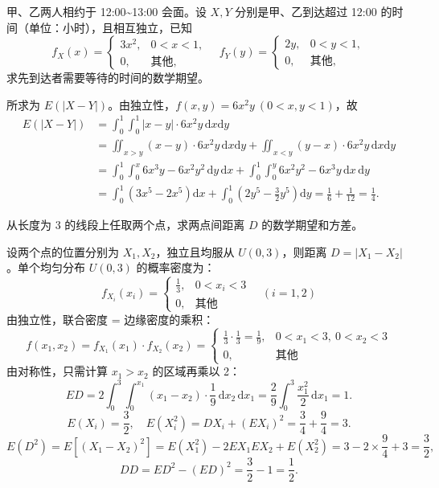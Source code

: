 ﻿\documentclass[lang=cn,11pt]{elegantbook}
\begin{document}
\begin{exercise}\label{exer:4-8-wait}
甲、乙两人相约于 12:00\textasciitilde 13:00 会面。设 \(X, Y\) 分别是甲、乙到达超过 12:00 的时间（单位：小时），且相互独立，已知
\[
f_X(x) = \begin{cases} 3x^2, & 0 < x < 1, \\ 0, & \text{其他}, \end{cases}\quad
f_Y(y) = \begin{cases} 2y, & 0 < y < 1, \\ 0, & \text{其他}, \end{cases}
\]
求先到达者需要等待的时间的数学期望。
\end{exercise}
\begin{solution}
所求为 \(E(|X-Y|)\)。由独立性，\(f(x,y) = 6x^2y\ (0 < x,y < 1)\)，故
\[
\begin{aligned}
E(|X-Y|) &= \int_0^1\!\!\int_0^1 |x-y| \cdot 6x^2 y\,\mathrm{d}x\mathrm{d}y \\
&= \iint_{x>y} (x-y) \cdot 6x^2 y\,\mathrm{d}x\mathrm{d}y + \iint_{x<y} (y-x) \cdot 6x^2 y\,\mathrm{d}x\mathrm{d}y \\
&= \int_0^1\!\!\int_0^x 6x^3y - 6x^2y^2\,\mathrm{d}y\,\mathrm{d}x + \int_0^1\!\!\int_0^y 6x^2y^2 - 6x^3y\,\mathrm{d}x\,\mathrm{d}y \\
&= \int_0^1 \!\left(3x^5 - 2x^5\right)\mathrm{d}x + \int_0^1 \!\left(2y^5 - \frac{3}{2}y^5\right)\mathrm{d}y = \frac{1}{6} + \frac{1}{12} = \frac{1}{4}.
\end{aligned}
\]
\end{solution}


\begin{exercise}\label{exer:4-two-points}
从长度为 3 的线段上任取两个点，求两点间距离 \(D\) 的数学期望和方差。
\end{exercise}
\begin{solution}
设两个点的位置分别为 \(X_1, X_2\)，独立且均服从 \(U(0,3)\)，则距离 \(D = |X_1 - X_2|\)。单个均匀分布 \( U(0,3) \) 的概率密度为：
\[f_{X_i}(x_i) =\begin{cases}\displaystyle \frac{1}{3}, & 0 < x_i < 3 \\0, & \text{其他}\end{cases}\quad (i=1,2)\]
由独立性，联合密度 = 边缘密度的乘积：
  \[
  f(x_1,x_2) = f_{X_1}(x_1) \cdot f_{X_2}(x_2) =
  \begin{cases}
  \displaystyle \frac{1}{3} \cdot \frac{1}{3} = \frac{1}{9}, & 0 < x_1 < 3,\ 0 < x_2 < 3 \\
  0, & \text{其他}
  \end{cases}
  \]
由对称性，只需计算 \(x_1 > x_2\) 的区域再乘以 2：
\[
ED = 2\int_0^3 \int_0^{x_1} (x_1 - x_2) \cdot \frac{1}{9}\,\mathrm{d}x_2\,\mathrm{d}x_1
= \frac{2}{9}\int_0^3 \frac{x_1^2}{2}\,\mathrm{d}x_1 = 1.
\]
\[
E(X_i) = \frac{3}{2},\quad E(X_i^2) = DX_i + (EX_i)^2 = \frac{3}{4} + \frac{9}{4} = 3.
\]
\[
E(D^2) = E[(X_1 - X_2)^2] = E(X_1^2) - 2EX_1 EX_2 + E(X_2^2) = 3 - 2 \times \frac{9}{4} + 3 = \frac{3}{2},
\]
\[
DD = ED^2 - (ED)^2 = \frac{3}{2} - 1 = \frac{1}{2}.
\]
\end{solution}
\end{document}

